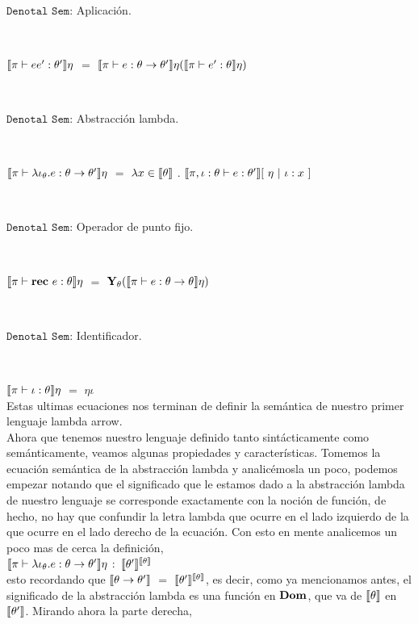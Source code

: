 \

\noindent
$\texttt{Denotal Sem:}$ Aplicaci\'on.\

\

$\llbracket \pi \vdash ee' : \theta' \rrbracket\eta$ $=$ $\llbracket \pi \vdash e : \theta \rightarrow \theta' \rrbracket\eta
														  (\llbracket \pi \vdash e' : \theta \rrbracket\eta)$

\

\noindent
$\texttt{Denotal Sem:}$ Abstracci\'on lambda.\

\

$\llbracket \pi \vdash \lambda \iota_{\theta} . e : \theta \rightarrow \theta' \rrbracket\eta$ $=$
						$\lambda x \in \llbracket \theta \rrbracket$ . $\llbracket \pi,\iota:\theta \vdash e : \theta' \rrbracket[\ \eta \ | \ \iota:x \ ]$
						
\

\noindent
$\texttt{Denotal Sem:}$ Operador de punto fijo.\

\

$\llbracket \pi \vdash \textbf{rec} \ e : \theta \rrbracket\eta$ $=$ $\textbf{Y}_{\theta} (\llbracket \pi \vdash e : \theta \rightarrow \theta \rrbracket\eta)$

\

\noindent
$\texttt{Denotal Sem:}$ Identificador.\

\

$\llbracket \pi \vdash \iota : \theta \rrbracket\eta$ $=$ $\eta \iota$\\

Estas ultimas ecuaciones nos terminan de definir la sem\'antica de nuestro 
primer lenguaje lambda arrow.\\

Ahora que tenemos nuestro lenguaje definido tanto sint\'acticamente como
sem\'anticamente, veamos algunas propiedades y caracter\'isticas. Tomemos
la ecuaci\'on sem\'antica de la abstracci\'on lambda y analic\'emosla un 
poco, podemos empezar notando que el significado que le estamos dado
a la abstracci\'on lambda de nuestro lenguaje se corresponde exactamente
con la noci\'on de funci\'on, de hecho, no hay que confundir la letra lambda
que ocurre en el lado izquierdo de la que ocurre en el lado derecho de la
ecuaci\'on. Con esto en mente analicemos un poco mas de cerca la definici\'on,\\

$\llbracket \pi \vdash \lambda \iota_{\theta} . e : \theta \rightarrow \theta' \rrbracket\eta$ $:$
$\llbracket \theta' \rrbracket^{\llbracket \theta \rrbracket}$\\

\noindent
esto recordando que $\llbracket \theta \rightarrow \theta' \rrbracket$ $=$ $\llbracket \theta' \rrbracket^{\llbracket \theta \rrbracket}$,
es decir, como ya mencionamos antes, el significado de la abstracci\'on lambda es
una funci\'on en $\textbf{Dom}$, que va de $\llbracket \theta \rrbracket$ en $\llbracket \theta' \rrbracket$. Mirando
ahora la parte derecha,\\

